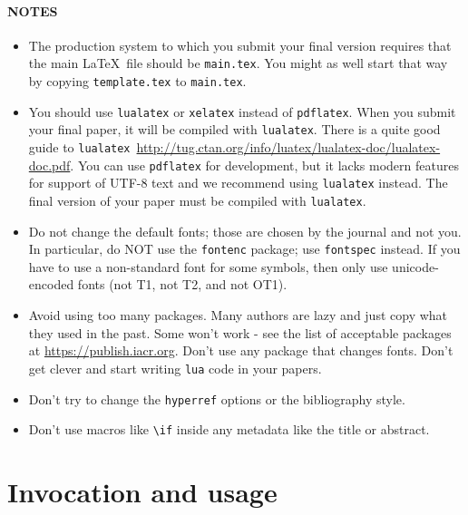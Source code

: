 \documentclass{iacrcc}
\begin{document}
\paragraph*{NOTES}
\begin{itemize}
\item The production system to which you submit your final version requires
  that the main \LaTeX\ file should be \texttt{main.tex}. You might as
  well start that way by copying \texttt{template.tex} to \texttt{main.tex}.
\item You should use \texttt{lualatex} or \texttt{xelatex} instead of
  \texttt{pdflatex}. When you submit your final paper, it will be
  compiled with \texttt{lualatex}. There is a quite good guide to
  \texttt{lualatex}~\url{http://tug.ctan.org/info/luatex/lualatex-doc/lualatex-doc.pdf}.
  You can use \texttt{pdflatex} for development, but it lacks modern
  features for support of UTF-8 text and we recommend using
  \texttt{lualatex} instead. The final version of your paper must be
  compiled with \texttt{lualatex}.
\item Do not change the default fonts; those are chosen by the journal and not you.
  In particular, do {\color{red}NOT} use the
  \texttt{fontenc} package; use \texttt{fontspec} instead. If you have
  to use a non-standard font for some symbols, then only use
  unicode-encoded fonts ({\color{red}not T1, not T2, and not OT1}).
\item Avoid using too many packages. Many authors are lazy and just
  copy what they used in the past. Some won't work - see the list of
  acceptable packages at \url{https://publish.iacr.org}. Don't use any
  package that changes fonts. Don't get clever and start writing
  \texttt{lua} code in your papers.
\item Don't try to change the \texttt{hyperref} options or the bibliography style.
\item Don't use macros like \verb+\if+ inside any metadata like the title or abstract.
\end{itemize}
\section{Invocation and usage}
\end{document}
